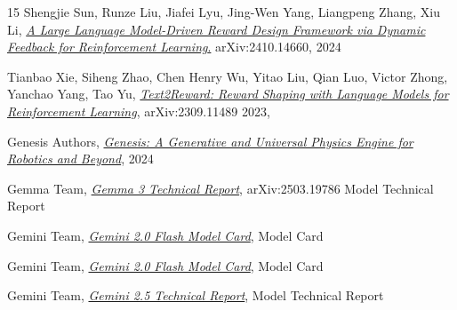 \documentclass[10pt,twocolumn]{article}
\begin{document}
\begin{thebibliography}{15}
Shengjie Sun, Runze Liu, Jiafei Lyu, Jing-Wen Yang, Liangpeng Zhang, Xiu Li,
\href{https://doi.org/10.48550/arXiv.2410.14660}{\emph{A Large Language Model-Driven Reward Design Framework via Dynamic Feedback for Reinforcement Learning}.}
arXiv:2410.14660, 2024

Tianbao Xie, Siheng Zhao, Chen Henry Wu, Yitao Liu, Qian Luo, Victor Zhong, Yanchao Yang, Tao Yu,
\href{https://doi.org/10.48550/arXiv.2309.11489}{\emph{Text2Reward: Reward Shaping with Language Models for Reinforcement Learning}},
arXiv:2309.11489 2023,

Genesis Authors, \href{https://github.com/Genesis-Embodied-AI/Genesis}{\emph{Genesis: A Generative and Universal Physics Engine for Robotics and Beyond}}, 2024

Gemma Team,
\href{https://arxiv.org/abs/2503.19786}{\emph{Gemma 3 Technical Report}},
arXiv:2503.19786
Model Technical Report

Gemini Team,
\href{https://storage.googleapis.com/model-cards/documents/gemini-2-flash.pdf}{\emph{Gemini 2.0 Flash Model Card}},
Model Card

Gemini Team,
\href{https://storage.googleapis.com/model-cards/documents/gemini-2-flash-lite.pdf}{\emph{Gemini 2.0 Flash Model Card}},
Model Card

Gemini Team,
\href{https://storage.googleapis.com/deepmind-media/gemini/gemini_v2_5_report.pdf}{\emph{Gemini 2.5 Technical Report}},
Model Technical Report

\end{thebibliography}
\end{document}
